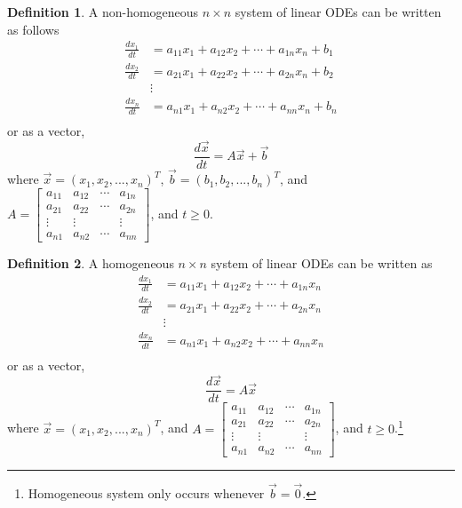 \documentclass[11pt]{amsart}
\theoremstyle{definition}\newtheorem{definition}{Definition}
\theoremstyle{definition}\newtheorem{notation}{Notation}
\theoremstyle{definition}\newtheorem{example}{Example}
\theoremstyle{theorem}\newtheorem{theorem}{Theorem}
\theoremstyle{theorem}\newtheorem{corollary}{Corollary}
\theoremstyle{theorem}\newtheorem{proposition}{Proposition}
\theoremstyle{theorem}\newtheorem{lemma}{Lemma}
\theoremstyle{theorem}\newtheorem{question}{Question}
\theoremstyle{remark}\newtheorem{remark}{Remark}
\begin{document}
\begin{definition}
    A non-homogeneous $n \times n$ system of linear ODEs can be written as follows
    \begin{align*}
        \frac{dx_1}{dt} &= a_{11}x_1 + a_{12}x_2 + \cdots + a_{1n}x_n + b_1 \\
        \frac{dx_2}{dt} &= a_{21}x_1 + a_{22}x_2 + \cdots + a_{2n}x_n + b_2 \\
        &\vdots \\
        \frac{dx_n}{dt} &= a_{n1}x_1 + a_{n2}x_2 + \cdots + a_{nn}x_n + b_n \\
    \end{align*}
    or as a vector,
    \begin{equation*}
        \frac{d\vec{x}}{dt} = A\vec{x} + \vec{b}
    \end{equation*}
    where $\vec{x} = (x_1, x_2,..., x_n)^T$, $\vec{b} = (b_1, b_2,..., b_n)^T$, and $A = \begin{bmatrix} a_{11} & a_{12} & \cdots & a_{1n} \\ a_{21} & a_{22} & \cdots & a_{2n} \\ \vdots & \vdots & & \vdots \\ a_{n1} & a_{n2} & \cdots & a_{nn} \end{bmatrix}$, and $t \geq 0$.
\end{definition}

\begin{definition}
    A homogeneous $n \times n$ system of linear ODEs can be written as
    \begin{align*}
        \frac{dx_1}{dt} &= a_{11}x_1 + a_{12}x_2 + \cdots + a_{1n}x_n \\
        \frac{dx_2}{dt} &= a_{21}x_1 + a_{22}x_2 + \cdots + a_{2n}x_n \\
        &\vdots \\
        \frac{dx_n}{dt} &= a_{n1}x_1 + a_{n2}x_2 + \cdots + a_{nn}x_n \\
    \end{align*}
    or as a vector,
    \begin{equation*}
        \frac{d\vec{x}}{dt} = A\vec{x}
    \end{equation*}
    where $\vec{x} = (x_1, x_2,..., x_n)^T$, and $A = \begin{bmatrix} a_{11} & a_{12} & \cdots & a_{1n} \\ a_{21} & a_{22} & \cdots & a_{2n} \\ \vdots & \vdots & & \vdots \\ a_{n1} & a_{n2} & \cdots & a_{nn} \end{bmatrix}$, and $t \geq 0$.\footnote{Homogeneous system only occurs whenever $\vec{b} = \vec{0}$.}
\end{definition}
\end{document}
